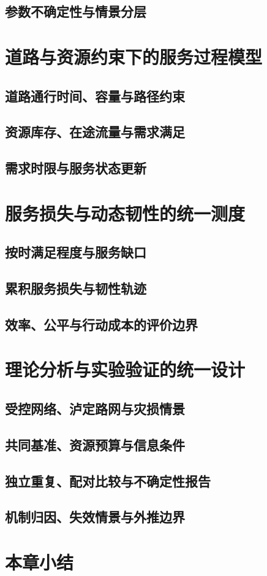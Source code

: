 \subsection{参数不确定性与情景分层}

\ThesisBlank

\section{道路与资源约束下的服务过程模型}
\subsection{道路通行时间、容量与路径约束}
\subsection{资源库存、在途流量与需求满足}
\subsection{需求时限与服务状态更新}

\ThesisBlank

\section{服务损失与动态韧性的统一测度}
\subsection{按时满足程度与服务缺口}
\subsection{累积服务损失与韧性轨迹}
\subsection{效率、公平与行动成本的评价边界}

\ThesisBlank

\section{理论分析与实验验证的统一设计}
\subsection{受控网络、泸定路网与灾损情景}
\subsection{共同基准、资源预算与信息条件}
\subsection{独立重复、配对比较与不确定性报告}
\subsection{机制归因、失效情景与外推边界}

\ThesisBlank

\section{本章小结}
\ThesisBlank
